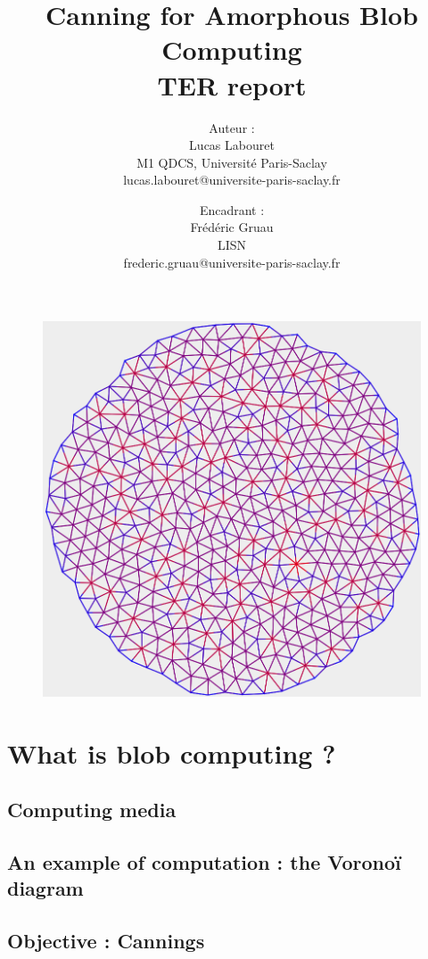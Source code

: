 \documentclass{article}
\title{
	Canning for Amorphous Blob Computing\\
	\small TER report
}
\author{
    Auteur :\\
    Lucas Labouret\\
    M1 QDCS, Université Paris-Saclay\\
    \small lucas.labouret@universite-paris-saclay.fr
    \and
    Encadrant :\\
    Frédéric Gruau\\
    LISN\\
    \small frederic.gruau@universite-paris-saclay.fr
}
\date{}
\begin{document}
 
\maketitle

\begin{figure}[H]
	\centering\includegraphics[width=0.9\linewidth]{assets/Circle500.png}
\end{figure}

\newpage
\tableofcontents
\newpage

\renewcommand{\thesection}{\Alph{section}}

\section{What is blob computing ?}

\subsection{Computing media}

\subsection{An example of computation : the Voronoï diagram}

\subsection{Objective : Cannings}
\end{document}
